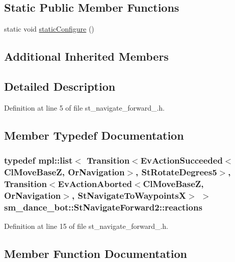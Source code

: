 \subsection*{Static Public Member Functions}
\begin{DoxyCompactItemize}
\item 
static void \hyperlink{structsm__dance__bot_1_1StNavigateForward2_a58d2a866ecf79f736d9fa54784c71ea8}{static\+Configure} ()
\end{DoxyCompactItemize}
\subsection*{Additional Inherited Members}


\subsection{Detailed Description}


Definition at line 5 of file st\+\_\+navigate\+\_\+forward\+\_.\+h.



\subsection{Member Typedef Documentation}
\subsubsection[{\texorpdfstring{reactions}{reactions}}]{\setlength{\rightskip}{0pt plus 5cm}typedef mpl\+::list$<$ Transition$<$Ev\+Action\+Succeeded$<${\bf Cl\+Move\+BaseZ}, {\bf Or\+Navigation}$>$, {\bf St\+Rotate\+Degrees5}$>$, Transition$<$Ev\+Action\+Aborted$<${\bf Cl\+Move\+BaseZ}, {\bf Or\+Navigation}$>$, {\bf St\+Navigate\+To\+WaypointsX}$>$ $>$ {\bf sm\+\_\+dance\+\_\+bot\+::\+St\+Navigate\+Forward2\+::reactions}}\hypertarget{structsm__dance__bot_1_1StNavigateForward2_ac9a6d0e0aa772d68bcb6d7932a21463a}{}\label{structsm__dance__bot_1_1StNavigateForward2_ac9a6d0e0aa772d68bcb6d7932a21463a}


Definition at line 15 of file st\+\_\+navigate\+\_\+forward\+\_.\+h.



\subsection{Member Function Documentation}
